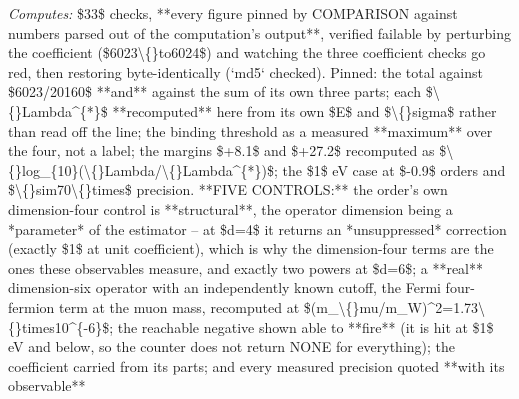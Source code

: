 \begin{description}
\emph{Computes:} \$33\$ checks, **every figure pinned by COMPARISON against numbers parsed out of the computation's output**, verified failable by perturbing the coefficient (\$6023\textbackslash\{\}to6024\$) and watching the three coefficient checks go red, then restoring byte-identically (`md5` checked). Pinned: the total against \$6023/20160\$ **and** against the sum of its own three parts; each \$\textbackslash\{\}Lambda\textasciicircum{}\{*\}\$ **recomputed** here from its own \$E\$ and \$\textbackslash\{\}sigma\$ rather than read off the line; the binding threshold as a measured **maximum** over the four, not a label; the margins \$+8.1\$ and \$+27.2\$ recomputed as \$\textbackslash\{\}log\_\{10\}(\textbackslash\{\}Lambda/\textbackslash\{\}Lambda\textasciicircum{}\{*\})\$; the \$1\$ eV case at \$-0.9\$ orders and \$\textbackslash\{\}sim70\textbackslash\{\}times\$ precision. **FIVE CONTROLS:** the order's own dimension-four control is **structural**, the operator dimension being a *parameter* of the estimator -- at \$d=4\$ it returns an *unsuppressed* correction (exactly \$1\$ at unit coefficient), which is why the dimension-four terms are the ones these observables measure, and exactly two powers at \$d=6\$; a **real** dimension-six operator with an independently known cutoff, the Fermi four-fermion term at the muon mass, recomputed at \$(m\_\textbackslash\{\}mu/m\_W)\textasciicircum{}2=1.73\textbackslash\{\}times10\textasciicircum{}\{-6\}\$; the reachable negative shown able to **fire** (it is hit at \$1\$ eV and below, so the counter does not return NONE for everything); the coefficient carried from its parts; and every measured precision quoted **with its observable**

\end{description}
